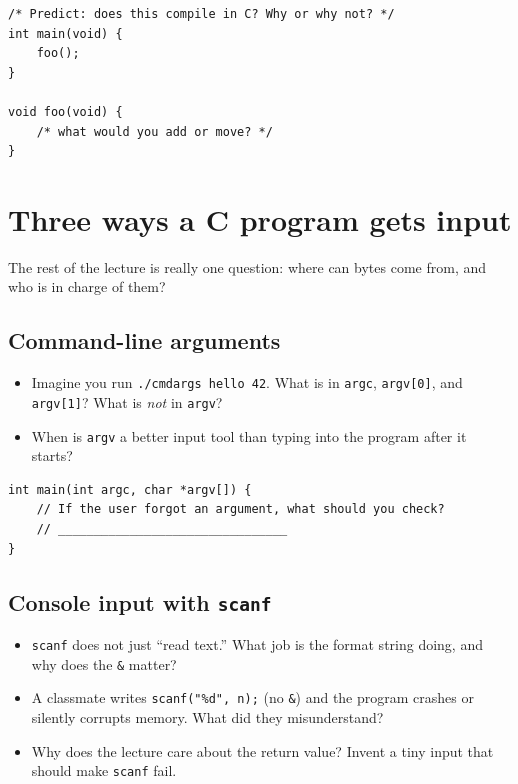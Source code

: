 \documentclass[12pt]{article}
\begin{document}
\begin{lstlisting}
/* Predict: does this compile in C? Why or why not? */
int main(void) {
    foo();
}

void foo(void) {
    /* what would you add or move? */
}
\end{lstlisting}

\vspace{1.8em}

\section{Three ways a C program gets input}

The rest of the lecture is really one question: where can bytes come from, and who is in charge of them?

\subsection{Command-line arguments}
\begin{itemize}
  \item Imagine you run \texttt{./cmdargs hello 42}. What is in \texttt{argc}, \texttt{argv[0]}, and \texttt{argv[1]}? What is \emph{not} in \texttt{argv}?
  \vspace{2.2em}
  \item When is \texttt{argv} a better input tool than typing into the program after it starts?
  \vspace{2.0em}
\end{itemize}

\begin{lstlisting}
int main(int argc, char *argv[]) {
    // If the user forgot an argument, what should you check?
    // ________________________________
}
\end{lstlisting}

\vspace{1.2em}

\subsection{Console input with \texttt{scanf}}
\begin{itemize}
  \item \texttt{scanf} does not just ``read text.'' What job is the format string doing, and why does the \texttt{\&} matter?
  \vspace{2.2em}
  \item A classmate writes \texttt{scanf("\%d", n);} (no \texttt{\&}) and the program crashes or silently corrupts memory. What did they misunderstand?
  \vspace{2.2em}
  \item Why does the lecture care about the return value? Invent a tiny input that should make \texttt{scanf} fail.
  \vspace{2.0em}
\end{itemize}
\end{document}
